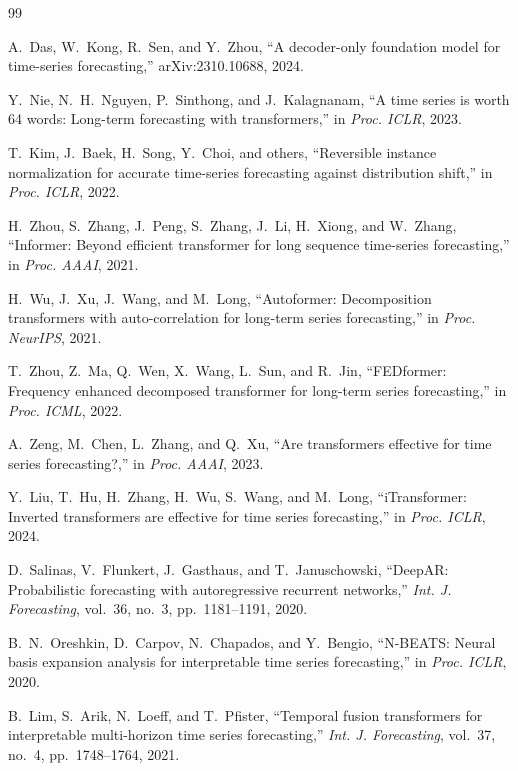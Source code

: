 \documentclass[conference]{IEEEtran}
\begin{document}
\begin{thebibliography}{99}

A.~Das, W.~Kong, R.~Sen, and Y.~Zhou,
``A decoder-only foundation model for time-series forecasting,''
arXiv:2310.10688, 2024.

Y.~Nie, N.~H.~Nguyen, P.~Sinthong, and J.~Kalagnanam,
``A time series is worth 64 words: Long-term forecasting with transformers,''
in \emph{Proc. ICLR}, 2023.

T.~Kim, J.~Baek, H.~Song, Y.~Choi, and others,
``Reversible instance normalization for accurate time-series forecasting against distribution shift,''
in \emph{Proc. ICLR}, 2022.

H.~Zhou, S.~Zhang, J.~Peng, S.~Zhang, J.~Li, H.~Xiong, and W.~Zhang,
``Informer: Beyond efficient transformer for long sequence time-series forecasting,''
in \emph{Proc. AAAI}, 2021.

H.~Wu, J.~Xu, J.~Wang, and M.~Long,
``Autoformer: Decomposition transformers with auto-correlation for long-term series forecasting,''
in \emph{Proc. NeurIPS}, 2021.

T.~Zhou, Z.~Ma, Q.~Wen, X.~Wang, L.~Sun, and R.~Jin,
``FEDformer: Frequency enhanced decomposed transformer for long-term series forecasting,''
in \emph{Proc. ICML}, 2022.

A.~Zeng, M.~Chen, L.~Zhang, and Q.~Xu,
``Are transformers effective for time series forecasting?,''
in \emph{Proc. AAAI}, 2023.

Y.~Liu, T.~Hu, H.~Zhang, H.~Wu, S.~Wang, and M.~Long,
``iTransformer: Inverted transformers are effective for time series forecasting,''
in \emph{Proc. ICLR}, 2024.

D.~Salinas, V.~Flunkert, J.~Gasthaus, and T.~Januschowski,
``DeepAR: Probabilistic forecasting with autoregressive recurrent networks,''
\emph{Int. J. Forecasting}, vol.~36, no.~3, pp.~1181--1191, 2020.

B.~N.~Oreshkin, D.~Carpov, N.~Chapados, and Y.~Bengio,
``N-BEATS: Neural basis expansion analysis for interpretable time series forecasting,''
in \emph{Proc. ICLR}, 2020.

B.~Lim, S.~Arik, N.~Loeff, and T.~Pfister,
``Temporal fusion transformers for interpretable multi-horizon time series forecasting,''
\emph{Int. J. Forecasting}, vol.~37, no.~4, pp.~1748--1764, 2021.


\end{thebibliography}
\end{document}
